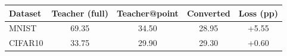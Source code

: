 \begin{tabular}{lcccc}\hline
Dataset & Teacher (full) & Teacher@point & Converted & Loss (pp) \\\hline
MNIST & 69.35 & 34.50 & 28.95 & +5.55 \\
CIFAR10 & 33.75 & 29.90 & 29.30 & +0.60 \\
\hline\end{tabular}
